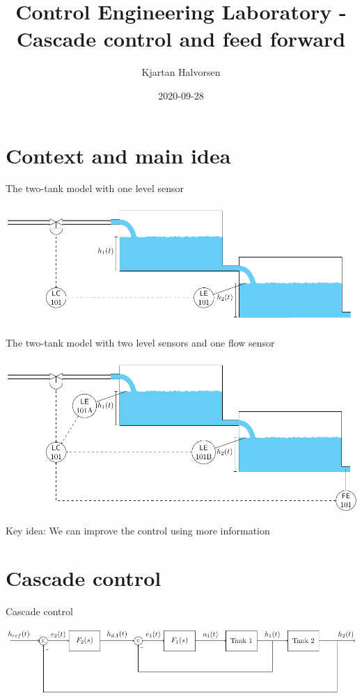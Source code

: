 \documentclass[presentation,aspectratio=169, usenames, dvipsnames]{beamer}
\author{Kjartan Halvorsen}
\date{2020-09-28}
\title{Control Engineering Laboratory - Cascade control and feed forward}
\begin{document}
\maketitle

\section{Context and main idea}
\label{sec:orgf16c449}
\begin{frame}[label={sec:org8d5908e}]{The two-tank model with one level sensor}
\begin{center}
\includegraphics[width=\linewidth]{../../figures/two-tanks-shutoff-valve}
\end{center}
\end{frame}

\begin{frame}[label={sec:orge7e62fe}]{The two-tank model with two level sensors and one flow sensor}
\begin{center}
\includegraphics[width=\linewidth]{../../figures/two-tanks-2LE-FE}
\end{center}

\alert{Key idea: We can improve the control using more information}
\end{frame}

\section{Cascade control}
\label{sec:org4a6df0b}
\begin{frame}[label={sec:org4fa23f0}]{Cascade control}
\begin{center}
\includegraphics[width=\linewidth]{../../figures/block-diagram-cascade-control.pdf}
\end{center}
\end{frame}
\end{document}
